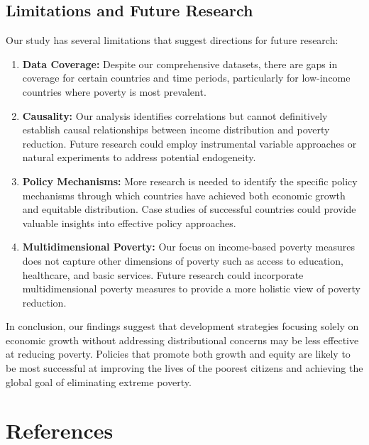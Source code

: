 \documentclass[12pt,a4paper]{article}
\begin{document}
\subsection{Limitations and Future Research}
Our study has several limitations that suggest directions for future research:
\begin{enumerate}
    \item \textbf{Data Coverage:} Despite our comprehensive datasets, there are gaps in coverage for certain countries and time periods, particularly for low-income countries where poverty is most prevalent.
    \item \textbf{Causality:} Our analysis identifies correlations but cannot definitively establish causal relationships between income distribution and poverty reduction. Future research could employ instrumental variable approaches or natural experiments to address potential endogeneity.
    \item \textbf{Policy Mechanisms:} More research is needed to identify the specific policy mechanisms through which countries have achieved both economic growth and equitable distribution. Case studies of successful countries could provide valuable insights into effective policy approaches.
    \item \textbf{Multidimensional Poverty:} Our focus on income-based poverty measures does not capture other dimensions of poverty such as access to education, healthcare, and basic services. Future research could incorporate multidimensional poverty measures to provide a more holistic view of poverty reduction.
\end{enumerate}

In conclusion, our findings suggest that development strategies focusing solely on economic growth without addressing distributional concerns may be less effective at reducing poverty. Policies that promote both growth and equity are likely to be most successful at improving the lives of the poorest citizens and achieving the global goal of eliminating extreme poverty.

\clearpage
\section{References}


\end{document}
